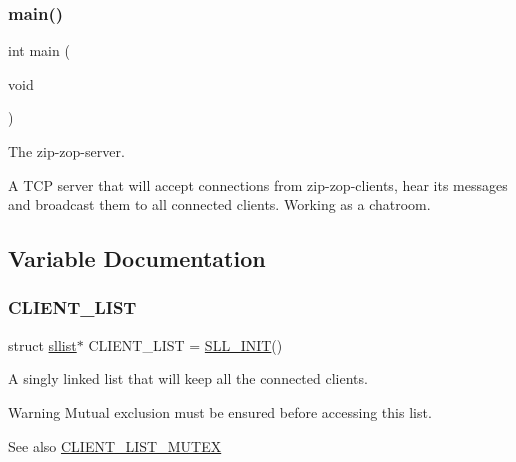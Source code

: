 \subsubsection{\texorpdfstring{main()}{main()}}
{\footnotesize\ttfamily int main (\begin{DoxyParamCaption}\item[{void}]{ }\end{DoxyParamCaption})}



The zip-\/zop-\/server. 

A T\+CP server that will accept connections from zip-\/zop-\/clients, hear its messages and broadcast them to all connected clients. Working as a chatroom. 

\subsection{Variable Documentation}
\mbox{\label{zip-zop-server_8c_a32076dcdfaf1057a014d74d01cc7e08e}} 
\subsubsection{\texorpdfstring{C\+L\+I\+E\+N\+T\+\_\+\+L\+I\+ST}{CLIENT\_LIST}}
{\footnotesize\ttfamily struct \hyperlink{structsllist}{sllist}$\ast$ C\+L\+I\+E\+N\+T\+\_\+\+L\+I\+ST = \hyperlink{sllist_8h_a4f1348bb9eb6fe8c2b112e39c1887290}{S\+L\+L\+\_\+\+I\+N\+IT}()}



A singly linked list that will keep all the connected clients. 

\begin{DoxyWarning}{Warning}
Mutual exclusion must be ensured before accessing this list.
\end{DoxyWarning}
\begin{DoxySeeAlso}{See also}
\hyperlink{zip-zop-server_8c_ac58873310e66c9bfafdbc798a8a7c7e2}{C\+L\+I\+E\+N\+T\+\_\+\+L\+I\+S\+T\+\_\+\+M\+U\+T\+EX} 
\end{DoxySeeAlso}
\mbox{\label{zip-zop-server_8c_ac58873310e66c9bfafdbc798a8a7c7e2}} 
